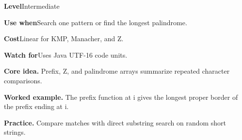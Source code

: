 \documentclass[10pt,letterpaper]{article}
\newcommand{\entrylabel}[1]{\textcolor{accent}{\bfseries #1}}
\begin{document}
\begin{guidebox}\small
\entrylabel{Level}\quad Intermediate\par
\entrylabel{Use when}\quad Search one pattern or find the longest palindrome.\par
\entrylabel{Cost}\quad Linear for KMP, Manacher, and Z.\par
\entrylabel{Watch for}\quad Uses Java UTF-16 code units.\par
\end{guidebox}
\noindent\textbf{Core idea.} Prefix, Z, and palindrome arrays summarize repeated character comparisons.\par
\noindent\textbf{Worked example.} The prefix function at i gives the longest proper border of the prefix ending at i.\par
\noindent\textbf{Practice.} Compare matches with direct substring search on random short strings.\par
\end{document}

